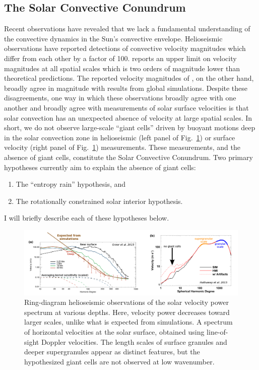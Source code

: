 \subsection{The Solar Convective Conundrum}
\label{sct:convective_conundrum}
Recent observations have revealed that we lack a fundamental understanding of the convective dynamics in the Sun's convective envelope.
Helioseismic observations \citep{hanasoge&all2012, greer&all2015} have reported detections of convective velocity magnitudes which differ from each other by a factor of 100.
\citet{hanasoge&all2012} reports an upper limit on velocity magnitudes at all spatial scales which is two orders of magnitude lower than theoretical predictions.
The reported velocity magnitudes of \citet{greer&all2015}, on the other hand, broadly agree in magnitude with results from global simulations.
Despite these disagreements, one way in which these observations broadly agree with one another and broadly agree with measurements of solar surface velocities \citep{hathaway&all2015} is that solar convection has an unexpected absence of velocity at large spatial scales.
In short, we do not observe large-scale ``giant cells'' driven by buoyant motions deep in the solar convection zone in helioseismic (left panel of Fig.~\ref{fig:conv_conundrum}) or surface velocity (right panel of Fig.~\ref{fig:conv_conundrum}) measurements.
These measurements, and the absence of giant cells, constitute the Solar Convective Conundrum.
Two primary hypotheses currently aim to explain the absence of giant cells: 
\begin{enumerate}
\item The ``entropy rain'' hypothesis, and
\item The rotationally constrained solar interior hypothesis.
\end{enumerate}
I will briefly describe each of these hypotheses below.

\begin{figure}[t!]
\includegraphics[width=\textwidth]{./figs/intro/conv_conundrum.pdf}
\caption[The convective conundrum.]
{
	\citep[a, annoted Fig.~3 from][]{greer&all2015} Ring-diagram helioseismic observations of the solar velocity power spectrum at various depths.
	Here, velocity power decreases toward larger scales, unlike what is expected from simulations.
	\citep[b, annotated Fig.~8 from][]{hathaway&all2015} A spectrum of horizontal velocities at the solar surface, obtained using line-of-sight Doppler velocities.
	The length scales of surface granules and deeper supergranules appear as distinct features, but the hypothesized giant cells are not observed at low wavenumber.
	\label{fig:conv_conundrum} 
}
\end{figure}

